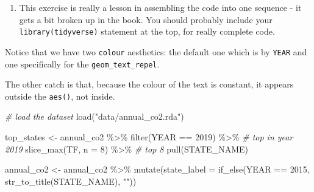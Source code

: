 \documentclass[
]{book}
\newenvironment{Shaded}{\begin{snugshade}}{\end{snugshade}}
\newcommand{\AttributeTok}[1]{\textcolor[rgb]{0.77,0.63,0.00}{#1}}
\newcommand{\CommentTok}[1]{\textcolor[rgb]{0.56,0.35,0.01}{\textit{#1}}}
\newcommand{\DecValTok}[1]{\textcolor[rgb]{0.00,0.00,0.81}{#1}}
\newcommand{\FunctionTok}[1]{\textcolor[rgb]{0.00,0.00,0.00}{#1}}
\newcommand{\NormalTok}[1]{#1}
\newcommand{\OtherTok}[1]{\textcolor[rgb]{0.56,0.35,0.01}{#1}}
\newcommand{\SpecialCharTok}[1]{\textcolor[rgb]{0.00,0.00,0.00}{#1}}
\newcommand{\StringTok}[1]{\textcolor[rgb]{0.31,0.60,0.02}{#1}}
\providecommand{\tightlist}{%
  \setlength{\itemsep}{0pt}\setlength{\parskip}{0pt}}
\begin{document}
\begin{enumerate}
\def\labelenumi{\arabic{enumi})}
\tightlist
\item
  This exercise is really a lesson in assembling the code into one sequence - it gets a bit broken up in the book. You should probably include your \texttt{library(tidyverse)} statement at the top, for really complete code.
\end{enumerate}

Notice that we have two \texttt{colour} aesthetics: the default one which is by \texttt{YEAR} and one specifically for the \texttt{geom\_text\_repel}.

The other catch is that, because the colour of the text is constant, it appears outside the \texttt{aes()}, not inside.

\begin{Shaded}
\begin{Highlighting}[]
\CommentTok{\# load the dataset}
\FunctionTok{load}\NormalTok{(}\StringTok{"data/annual\_co2.rda"}\NormalTok{)}

\NormalTok{top\_states }\OtherTok{\textless{}{-}}\NormalTok{ annual\_co2 }\SpecialCharTok{\%\textgreater{}\%}
  \FunctionTok{filter}\NormalTok{(YEAR }\SpecialCharTok{==} \DecValTok{2019}\NormalTok{) }\SpecialCharTok{\%\textgreater{}\%}     \CommentTok{\# top in year 2019}
  \FunctionTok{slice\_max}\NormalTok{(TF, }\AttributeTok{n =} \DecValTok{8}\NormalTok{) }\SpecialCharTok{\%\textgreater{}\%}  \CommentTok{\# top 8 }
  \FunctionTok{pull}\NormalTok{(STATE\_NAME) }

\NormalTok{annual\_co2 }\OtherTok{\textless{}{-}}\NormalTok{ annual\_co2 }\SpecialCharTok{\%\textgreater{}\%} 
  \FunctionTok{mutate}\NormalTok{(}\AttributeTok{state\_label =} \FunctionTok{if\_else}\NormalTok{(YEAR }\SpecialCharTok{==} \DecValTok{2015}\NormalTok{, }\FunctionTok{str\_to\_title}\NormalTok{(STATE\_NAME), }\StringTok{""}\NormalTok{))}


\end{Highlighting}
\end{Shaded}
\end{document}
